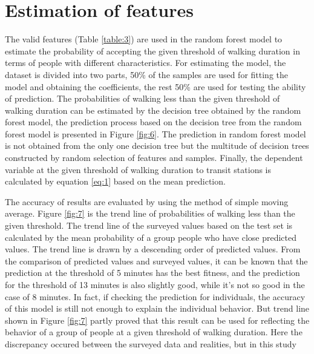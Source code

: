 \documentclass[Journal,letterpaper]{ascelike-new}
\begin{document}
%
\section{Estimation of features}
The valid features (Table \ref{table:3}) are used in the random forest model to estimate the probability of accepting the given threshold of walking duration in terms of people with different characteristics. For estimating the model, the dataset is divided into two parts, 50\% of the samples are used for fitting the model and obtaining the coefficients, the rest 50\% are used for testing the ability of prediction. The probabilities of walking less than the given threshold of walking duration can be estimated by the decision tree obtained by the random forest model, the prediction process based on the decision tree from the random forest model is presented in Figure \ref{fig:6}. The prediction in random forest model is not obtained from the only one decision tree but the multitude of decision trees constructed by random selection of features and samples. Finally, the dependent variable at the given threshold of walking duration to transit stations is calculated by equation \ref{eq:1} based on the mean prediction.

%
The accuracy of results are evaluated by using the method of simple moving average. Figure \ref{fig:7} is the trend line of probabilities of walking less than the given threshold. 
The trend line of the surveyed values based on the test set is calculated by the mean probability of a group people who have close predicted values. The trend line is drawn by a descending order of predicted values. From the comparison of predicted values and surveyed values, it can be known that the prediction at the threshold of 5 minutes has the best fitness, and the prediction for the threshold of 13 minutes is also slightly good, while it’s not so good in the case of 8 minutes. In fact, if checking the prediction for individuals, the accuracy of this model is still not enough to explain the individual behavior. But trend line shown in Figure \ref{fig:7} partly proved that this result can be used for reflecting the behavior of a group of people at a given threshold of walking duration. Here the discrepancy occured between the surveyed data and realities, but in this study

%
\end{document}
